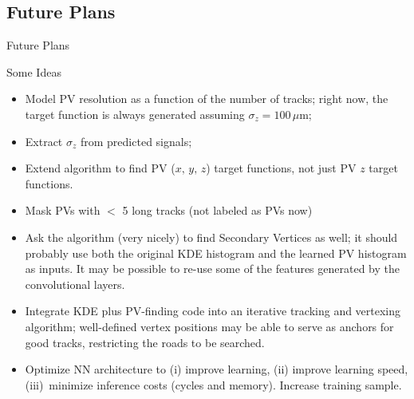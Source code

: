 \subsection{Future Plans}
\begin{frame}{Future Plans}
\vskip -0.10in
  \begin{block}{Some Ideas}
    \begin{itemize}
        \item 
          Model PV resolution as a function of the number of tracks; right now, the target
          function is always generated assuming $ \sigma_z = 100 \, \mu $m;
        \item
          Extract $ \sigma_z $ from predicted signals;
        \item
          Extend algorithm to find PV ($ x, \, y, \, z $) target functions,
          not just PV $ z $ target functions.
        \item 
        \textcolor{brickred}{Mask PVs with $ < $ 5 long tracks (not labeled as PVs  now)} 
        \item
          Ask the algorithm (very nicely) to find Secondary Vertices as well;
          it should probably use both the original KDE histogram and the 
          learned PV histogram as inputs.
          It may be possible to re-use some of the features generated by the 
          convolutional layers.
        \item
          Integrate  KDE plus PV-finding code into an iterative tracking and vertexing
          algorithm; well-defined vertex positions may be able to serve as anchors for 
          good tracks, restricting the roads to be searched.  
        \item
          Optimize NN architecture to (i) improve learning, (ii) improve learning speed,
          (iii)~minimize inference costs (cycles and memory).
          Increase training sample.
   \end{itemize}
  \end{block}
\end{frame}





